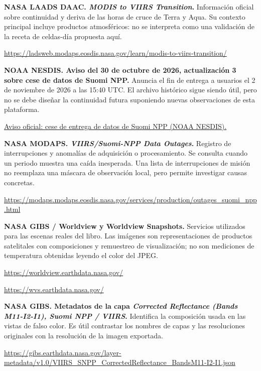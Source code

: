 \begin{enumerate}[label={[\arabic*]},ref=\arabic*,leftmargin=2.2em,itemsep=1em]
\item\label{src:transition} \textbf{NASA LAADS DAAC. \emph{MODIS to VIIRS Transition}.}
Información oficial sobre continuidad y deriva de las horas de cruce de Terra y Aqua.
Su contexto principal incluye productos atmosféricos: no se interpreta como una
validación de la receta de celdas-día propuesta aquí.
\par\url{https://ladsweb.modaps.eosdis.nasa.gov/learn/modis-to-viirs-transition/}

\item\label{src:noaa-snpp} \textbf{NOAA NESDIS. Aviso del 30 de octubre de 2026, actualización
3 sobre cese de datos de Suomi NPP.} Anuncia el fin de entrega a usuarios el 2 de noviembre
de 2026 a las 15:40 UTC. El archivo histórico sigue siendo útil, pero no se debe diseñar
la continuidad futura suponiendo nuevas observaciones de esta plataforma.
\par\href{https://www.nesdis.noaa.gov/news/update-3-cessation-of-suomi-national-polar-orbiting-partnership-s-npp-data-users-november-02-2026-1540-utc-and-decommissioning-issued-october-30-2026-1400-utc}{Aviso oficial: cese de entrega de datos de Suomi NPP (NOAA NESDIS).}

\item\label{src:outages} \textbf{NASA MODAPS. \emph{VIIRS/Suomi-NPP Data Outages}.}
Registro de interrupciones y anomalías de adquisición o procesamiento. Se consulta
cuando un periodo muestra una caída inesperada. Una lista de interrupciones de misión
no reemplaza una máscara de observación local, pero permite investigar causas concretas.
\par\url{https://modaps.modaps.eosdis.nasa.gov/services/production/outages_suomi_npp.html}

\item\label{src:worldview} \textbf{NASA GIBS / Worldview y Worldview Snapshots.}
Servicios utilizados para las escenas reales del libro. Las imágenes son representaciones
de productos satelitales con composiciones y remuestreo de visualización; no son mediciones
de temperatura obtenidas leyendo el color del JPEG.
\par\url{https://worldview.earthdata.nasa.gov/}
\par\url{https://wvs.earthdata.nasa.gov/}

\item\label{src:gibs} \textbf{NASA GIBS. Metadatos de la capa \emph{Corrected Reflectance
(Bands M11-I2-I1), Suomi NPP / VIIRS}.} Identifica la composición usada en las vistas de
falso color. Es útil contrastar los nombres de capas y las resoluciones originales con
la resolución de la imagen exportada.
\par\url{https://gibs.earthdata.nasa.gov/layer-metadata/v1.0/VIIRS_SNPP_CorrectedReflectance_BandsM11-I2-I1.json}


\end{enumerate}
